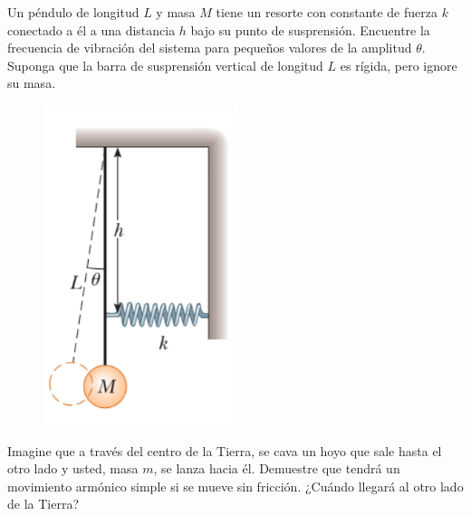 \begin{mdframed}[style=warning]
	\begin{ejercicio}
		Un péndulo de longitud $L$ y masa $M$ tiene un resorte con constante de fuerza $k$ conectado a él a una distancia $h$ bajo su punto de susprensión. Encuentre la frecuencia de vibración del sistema para pequeños valores de la amplitud $\theta$. Suponga que la barra de susprensión vertical de longitud $L$ es rígida, pero ignore su masa.
		
		\begin{figure}[H]
			\centering
			\includegraphics[scale=0.3]{./img/ej2.png}
		\end{figure}
	\end{ejercicio}
\end{mdframed}





















\begin{mdframed}[style=warning]
	\begin{ejercicio}
		Imagine que a través del centro de la Tierra, se cava un hoyo que sale hasta el otro lado y usted, masa $m$, se lanza hacia él. Demuestre que tendrá un movimiento armónico simple si se mueve sin fricción. ¿Cuándo llegará al otro lado de la Tierra?
	\end{ejercicio}
\end{mdframed}







